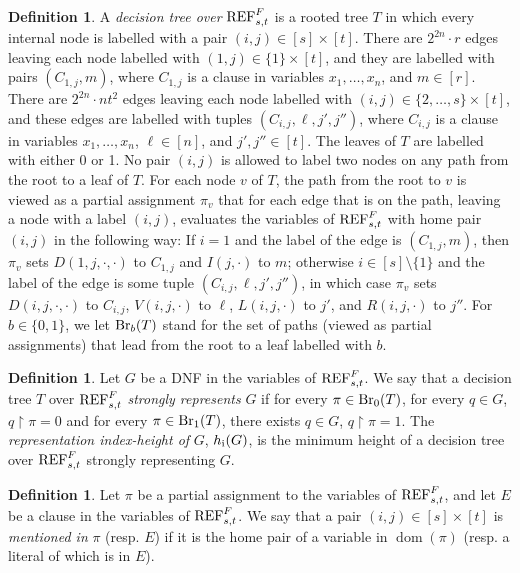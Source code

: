 \documentclass[10pt,a4paper]{article}
\theoremstyle{remark}
\newtheorem*{switching lemma}{Switching Lemma}
\newtheorem*{open problem}{Open Problem}
\theoremstyle{definition}
\newtheorem{definition}[theorem]{Definition}
\DeclareMathOperator{\dom}{dom}
\begin{document}
\begin{definition}
\label{def:decision-tree-for-REF-F-s-t}
A \emph{decision tree over} $\textnormal{REF}^{F}_{s,t}$ is a rooted tree $T$ in which every internal node is labelled with a pair $(i,j) \in [s] \times [t]$. There are $2^{2n} \cdot r$ edges leaving each node labelled with $(1,j) \in \{1\} \times [t]$, and they are labelled with pairs $(C_{1,j}, m)$, where $C_{1,j}$ is a clause in variables $x_1, \ldots, x_n$, and $m \in [r]$. There are $2^{2n} \cdot nt^2$ edges leaving each node labelled with $(i,j) \in \{2, \ldots, s\} \times [t]$, and these edges are labelled with tuples $(C_{i,j}, \ell, j', j'')$, where $C_{i,j}$ is a clause in variables $x_1, \ldots, x_n$, $\ell \in [n]$, and $j',j'' \in [t]$. 
The leaves of $T$ are labelled with either 0 or 1. No pair $(i,j)$ is allowed to label two nodes on any path from the root to a leaf of $T$. For each node $v$ of $T$, the path from the root to $v$ is viewed as a partial assignment $\pi_v$ that for each edge that is on the path, leaving a node  with a label $(i,j)$, evaluates the variables of $\textnormal{REF}^{F}_{s,t}$ with home pair $(i,j)$ in the following way: If $i=1$ and the label of the edge is $(C_{1,j}, m)$, then $\pi_v$ sets $D(1,j,\cdot, \cdot)$ to $C_{1,j}$ and $I(j, \cdot)$ to $m$; otherwise $i \in [s] \setminus \{1\}$ and the label of the edge is some tuple $(C_{i,j}, \ell, j', j'')$, in which case $\pi_v$ sets $D(i,j,\cdot, \cdot)$ to $C_{i,j}$, $V(i,j,\cdot)$ to $\ell$, $L(i,j,\cdot)$ to $j'$, and $R(i,j,\cdot)$ to $j''$.
For $b \in \{0,1\}$, we let $\textnormal{Br}_b(T)$ stand for the set of paths (viewed as partial assignments) that lead from the root to a leaf labelled with $b$. 
\end{definition}

\begin{definition}
\label{def:strongly-represents-and-index-height}
Let $G$ be a DNF in the variables of $\textnormal{REF}^{F}_{s,t}$. We say that a decision tree $T$ over $\textnormal{REF}^{F}_{s,t}$ \emph{strongly represents} $G$ if for every $\pi \in \textnormal{Br}_0(T)$, for every $q \in G$, $q \! \restriction \! \pi = 0$ and for every $\pi \in \textnormal{Br}_1(T)$, there exists $q \in G$, $q \! \restriction \! \pi = 1$. The \emph{representation index-height of} $G$, $h_{\textnormal{i}}(G)$, is the minimum height of a decision tree over $\textnormal{REF}^{F}_{s,t}$ strongly representing $G$.
\end{definition}

\begin{definition}
\label{def:mentioned}
Let $\pi$ be a partial assignment to the variables of $\textnormal{REF}^{F}_{s,t}$, and let $E$ be a clause in the variables of $\textnormal{REF}^F_{s,t}$. We say that a pair $(i,j) \in [s] \times [t]$ is \emph{mentioned in} $\pi$ (resp. $E$) if it is the home pair of a variable in $\dom(\pi)$ (resp. a literal of which is in $E$).
\end{definition}
\end{document}
